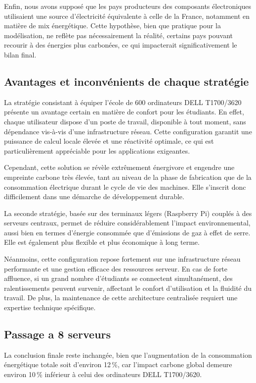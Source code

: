 Enfin, nous avons supposé que les pays producteurs des composants électroniques utilisaient une source d’électricité équivalente à celle de la France, notamment en matière de mix énergétique. Cette hypothèse, bien que pratique pour la modélisation, ne reflète pas nécessairement la réalité, certains pays pouvant recourir à des énergies plus carbonées, ce qui impacterait significativement le bilan final.

\subsection*{Avantages et inconvénients de chaque stratégie}

La stratégie consistant à équiper l’école de 600 ordinateurs DELL T1700/3620 présente un avantage certain en matière de confort pour les étudiants. En effet, chaque utilisateur dispose d’un poste de travail, disponible à tout moment, sans dépendance vis-à-vis d’une infrastructure réseau. Cette configuration garantit une puissance de calcul locale élevée et une réactivité optimale, ce qui est particulièrement appréciable pour les applications exigeantes.

Cependant, cette solution se révèle extrêmement énergivore et engendre une empreinte carbone très élevée, tant au niveau de la phase de fabrication que de la consommation électrique durant le cycle de vie des machines. Elle s’inscrit donc difficilement dans une démarche de développement durable.



La seconde stratégie, basée sur des terminaux légers (Raspberry Pi) couplés à des serveurs centraux, permet de réduire considérablement l’impact environnemental, aussi bien en termes d’énergie consommée que d’émissions de gaz à effet de serre. Elle est également plus flexible et plus économique à long terme.

Néanmoins, cette configuration repose fortement sur une infrastructure réseau performante et une gestion efficace des ressources serveur. En cas de forte affluence, si un grand nombre d’étudiants se connectent simultanément, des ralentissements peuvent survenir, affectant le confort d’utilisation et la fluidité du travail. De plus, la maintenance de cette architecture centralisée requiert une expertise technique spécifique.
\subsection*{Passage a 8 serveurs}

La conclusion finale reste inchangée, bien que l'augmentation de la consommation énergétique totale soit 
d'environ 12\,\%, car l'impact carbone global demeure environ 10\,\% inférieur à celui des ordinateurs DELL T1700/3620.
